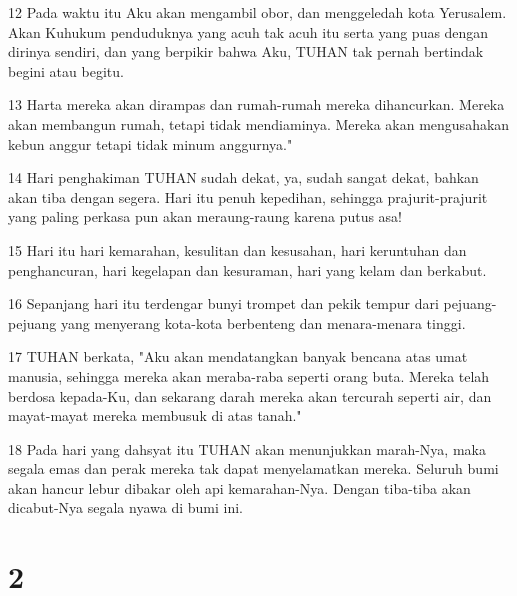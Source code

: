 \par 12 Pada waktu itu Aku akan mengambil obor, dan menggeledah kota Yerusalem. Akan Kuhukum penduduknya yang acuh tak acuh itu serta yang puas dengan dirinya sendiri, dan yang berpikir bahwa Aku, TUHAN tak pernah bertindak begini atau begitu.
\par 13 Harta mereka akan dirampas dan rumah-rumah mereka dihancurkan. Mereka akan membangun rumah, tetapi tidak mendiaminya. Mereka akan mengusahakan kebun anggur tetapi tidak minum anggurnya."
\par 14 Hari penghakiman TUHAN sudah dekat, ya, sudah sangat dekat, bahkan akan tiba dengan segera. Hari itu penuh kepedihan, sehingga prajurit-prajurit yang paling perkasa pun akan meraung-raung karena putus asa!
\par 15 Hari itu hari kemarahan, kesulitan dan kesusahan, hari keruntuhan dan penghancuran, hari kegelapan dan kesuraman, hari yang kelam dan berkabut.
\par 16 Sepanjang hari itu terdengar bunyi trompet dan pekik tempur dari pejuang-pejuang yang menyerang kota-kota berbenteng dan menara-menara tinggi.
\par 17 TUHAN berkata, "Aku akan mendatangkan banyak bencana atas umat manusia, sehingga mereka akan meraba-raba seperti orang buta. Mereka telah berdosa kepada-Ku, dan sekarang darah mereka akan tercurah seperti air, dan mayat-mayat mereka membusuk di atas tanah."
\par 18 Pada hari yang dahsyat itu TUHAN akan menunjukkan marah-Nya, maka segala emas dan perak mereka tak dapat menyelamatkan mereka. Seluruh bumi akan hancur lebur dibakar oleh api kemarahan-Nya. Dengan tiba-tiba akan dicabut-Nya segala nyawa di bumi ini.

\chapter{2}

